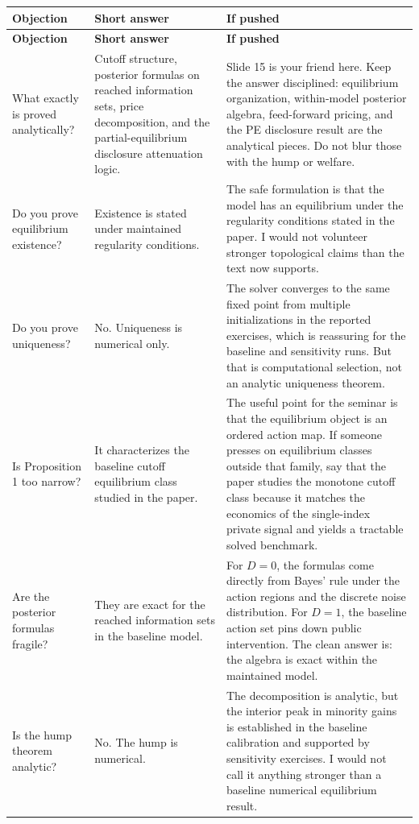 \documentclass[9pt,a4paper]{extarticle}
\begin{document}
{\footnotesize
\begin{longtable}{@{}P{0.24\textwidth}P{0.22\textwidth}P{0.48\textwidth}@{}}
\toprule
\textbf{Objection} & \textbf{Short answer} & \textbf{If pushed} \\
\midrule
\endfirsthead
\toprule
\textbf{Objection} & \textbf{Short answer} & \textbf{If pushed} \\
\midrule
\endhead
What exactly is proved analytically? &
Cutoff structure, posterior formulas on reached information sets, price decomposition, and the partial-equilibrium disclosure attenuation logic. &
Slide 15 is your friend here. Keep the answer disciplined: equilibrium organization, within-model posterior algebra, feed-forward pricing, and the PE disclosure result are the analytical pieces. Do not blur those with the hump or welfare. \\

Do you prove equilibrium existence? &
Existence is stated under maintained regularity conditions. &
The safe formulation is that the model has an equilibrium under the regularity conditions stated in the paper. I would not volunteer stronger topological claims than the text now supports. \\

Do you prove uniqueness? &
No. Uniqueness is numerical only. &
The solver converges to the same fixed point from multiple initializations in the reported exercises, which is reassuring for the baseline and sensitivity runs. But that is computational selection, not an analytic uniqueness theorem. \\

Is Proposition 1 too narrow? &
It characterizes the baseline cutoff equilibrium class studied in the paper. &
The useful point for the seminar is that the equilibrium object is an ordered action map. If someone presses on equilibrium classes outside that family, say that the paper studies the monotone cutoff class because it matches the economics of the single-index private signal and yields a tractable solved benchmark. \\

Are the posterior formulas fragile? &
They are exact for the reached information sets in the baseline model. &
For $D=0$, the formulas come directly from Bayes' rule under the action regions and the discrete noise distribution. For $D=1$, the baseline action set pins down public intervention. The clean answer is: the algebra is exact within the maintained model. \\

Is the hump theorem analytic? &
No. The hump is numerical. &
The decomposition is analytic, but the interior peak in minority gains is established in the baseline calibration and supported by sensitivity exercises. I would not call it anything stronger than a baseline numerical equilibrium result. \\
\bottomrule
\end{longtable}
}
\end{document}

